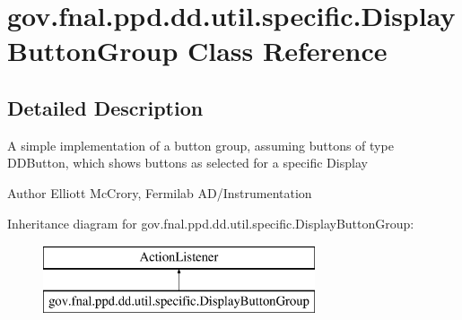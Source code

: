 \hypertarget{classgov_1_1fnal_1_1ppd_1_1dd_1_1util_1_1specific_1_1DisplayButtonGroup}{\section{gov.\-fnal.\-ppd.\-dd.\-util.\-specific.\-Display\-Button\-Group Class Reference}
\label{classgov_1_1fnal_1_1ppd_1_1dd_1_1util_1_1specific_1_1DisplayButtonGroup}
}


\subsection{Detailed Description}
A simple implementation of a button group, assuming buttons of type D\-D\-Button, which shows buttons as selected for a specific Display

\begin{DoxyAuthor}{Author}
Elliott Mc\-Crory, Fermilab A\-D/\-Instrumentation 
\end{DoxyAuthor}
Inheritance diagram for gov.\-fnal.\-ppd.\-dd.\-util.\-specific.\-Display\-Button\-Group\-:\begin{figure}[H]
\begin{center}
\leavevmode
\includegraphics[height=2.000000cm]{classgov_1_1fnal_1_1ppd_1_1dd_1_1util_1_1specific_1_1DisplayButtonGroup}
\end{center}
\end{figure}
